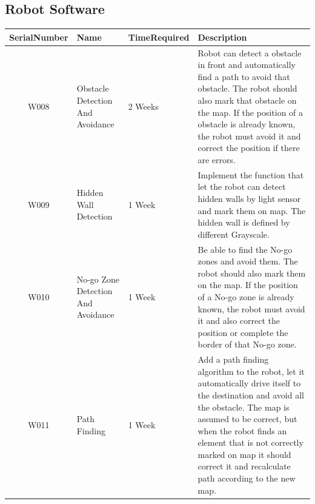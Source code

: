\documentclass[11pt, a4paper]{report}
\begin{document}
\subsection{Robot Software}
\begin{tabular}{|c|p{2.3cm}|p{3cm}|p{7cm}|}%
\hline
SerialNumber     &	Name 	&	TimeRequired		&	Description	
								\\ \hline
W008		&	Obstacle Detection And Avoidance & 2 Weeks	& Robot can detect a obstacle in front and automatically find a path to avoid that obstacle. The robot should also mark that obstacle on the map. If the position of a obstacle is already known, the robot must avoid it and correct the position if there are errors. \\ \hline
W009  &  Hidden Wall Detection & 1 Week & Implement the function that let the robot can detect hidden walls by light sensor and mark them on map. The hidden wall is defined by different Grayscale.\\ \hline 
W010 & No-go Zone Detection And Avoidance & 1 Week & Be able to find the No-go zones and avoid them. The robot should also mark them on the map. If the position of a No-go zone is already known, the robot must avoid it and also correct the position or complete the border of that No-go zone.\\  \hline
W011 & Path Finding & 1 Week & Add a path finding algorithm to the robot, let it automatically drive itself to the destination and avoid all the obstacle. The map is assumed to be correct, but when the robot finds an element that is not correctly marked on map it should correct it and recalculate path according to the new map.\\ \hline
\end{tabular}


\end{document}

